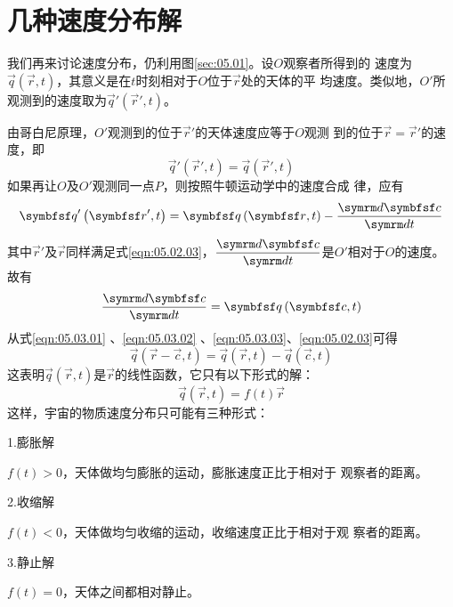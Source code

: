 \section{几种速度分布解}\label{sec:05.03}

我们再来讨论速度分布，仍利用图\ref{sec:05.01}。设$ O $观察者所得到的
速度为$ \vec{ q } \left( \vec{r} , t \right) $，其意义是在$ t $时刻相对于$ O $位于$ \vec{r} $处的天体的平
均速度。类似地，$ O' $所观测到的速度取为$ \vec{ q }' \left( \vec{r} ', t \right) $。

由哥白尼原理，$ O' $观测到的位于$\vec{r}'$的天体速度应等于$ O $观测
到的位于$ \vec{r} = \vec{r}' $的速度，即
\begin{equation}\label{eqn:05.03.01}
  \vec{q} ' \left( \vec{r} ' , t \right) = \vec{q} \left( \vec{r} ' , t \right)
\end{equation}
如果再让$ O $及$ O' $观测同一点$ P $，则按照牛顿运动学中的速度合成
律，应有
\begin{equation}\label{eqn:05.03.02}
  \vec{q} ' \left( \vec{r} ' , t \right) = \vec{q} \left( \vec{r} , t \right) - \frac{ \dif \vec{c} }{\dif t}
\end{equation}
其中$ \vec{r}' $及$ \vec{r} $同样满足式\eqref{eqn:05.02.03}，$ \dfrac{ \dif \vec{c} }{\dif t} $是$ O' $相对于$ O $的速度。故有
\begin{equation}\label{eqn:05.03.03}
  \frac { \dif \vec{c} } { \dif t } = \vec{q} \left( \vec{c} , t \right)
\end{equation}
从式\eqref{eqn:05.03.01} 、\eqref{eqn:05.03.02} 、\eqref{eqn:05.03.03}、\eqref{eqn:05.02.03}可得
\begin{equation}\label{eqn:05.03.04}
  \vec{q} \left( \vec{r} -\vec{c} , t \right) = \vec{q} \left( \vec{r} , t \right) - \vec{q} \left( \vec{c} , t \right)
\end{equation}
这表明$ \vec{q} \left( \vec{r} , t \right) $是$ \vec{r} $的线性函数，它只有以下形式的解：
\begin{equation}\label{eqn:05.03.05}
  \vec{q} \left( \vec{r} , t \right) = f \left(t\right) \vec{r}
\end{equation}
这样，宇宙的物质速度分布只可能有三种形式：

\textsf{1.膨胀解}

$ f \left( t \right) > 0 $，天体做均匀膨胀的运动，膨胀速度正比于相对于
观察者的距离。

\textsf{2.收缩解}

$ f \left( t \right) < 0 $，天体做均匀收缩的运动，收缩速度正比于相对于观
察者的距离。

\clearpage
\textsf{3.静止解}

$ f \left( t \right) = 0 $，天体之间都相对静止。
